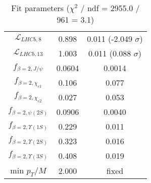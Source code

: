 \begin{table}[h!]
\begin{tabular}{c|c|c}
$\mathcal L_{LHCb,8}$ & 0.898 & 0.011 (-2.049 $\sigma$) \\
$\mathcal L_{LHCb,13}$ & 1.003 & 0.011 (0.088 $\sigma$) \\
$f_{\beta=2,J/\psi}$ & 0.0604 & 0.0014 \\
$f_{\beta=2,\chi_{c1}}$ & 0.106 & 0.077 \\
$f_{\beta=2,\chi_{c2}}$ & 0.027 & 0.053 \\
$f_{\beta=2,\psi(2S)}$ & 0.0906 & 0.0040 \\
$f_{\beta=2,\Upsilon(1S)}$ & 0.229 & 0.011 \\
$f_{\beta=2,\Upsilon(2S)}$ & 0.323 & 0.016 \\
$f_{\beta=2,\Upsilon(3S)}$ & 0.408 & 0.019 \\
min $p_T/M$ & 2.000 & fixed \\
\end{tabular}
\caption{Fit parameters ($\chi^2$ / ndf = 2955.0 / 961 = 3.1)}
\end{table}
